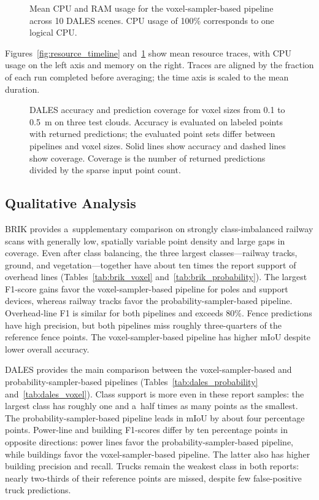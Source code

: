 \begin{figure}[H]
  \centering
  \caption{Mean CPU and RAM usage for the voxel-sampler-based pipeline across 10 DALES scenes. CPU usage of 100\% corresponds to one logical CPU.}
  \label{fig:resource_timeline_voxel}
\end{figure}

Figures~\ref{fig:resource_timeline} and~\ref{fig:resource_timeline_voxel} show mean resource traces, with CPU usage on the left axis and memory on the right. Traces are aligned by the fraction of each run completed before averaging; the time axis is scaled to the mean duration.

\begin{figure}[H]
  \centering
  \voxelsizeplot
  \caption{DALES accuracy and prediction coverage for voxel sizes from 0.1 to 0.5~m on three test clouds. Accuracy is evaluated on labeled points with returned predictions; the evaluated point sets differ between pipelines and voxel sizes. Solid lines show accuracy and dashed lines show coverage. Coverage is the number of returned predictions divided by the sparse input point count.}
  \label{fig:dales_voxel_size}
\end{figure}

\subsection{Qualitative Analysis}

BRIK provides a~supplementary comparison on strongly class-imbalanced railway scans with generally low, spatially variable point density and large gaps in coverage. Even after class balancing, the three largest classes---railway tracks, ground, and vegetation---together have about ten times the report support of overhead lines (Tables~\ref{tab:brik_voxel} and~\ref{tab:brik_probability}). The largest F1-score gains favor the voxel-sampler-based pipeline for poles and support devices, whereas railway tracks favor the probability-sampler-based pipeline. Overhead-line F1 is similar for both pipelines and exceeds 80\%. Fence predictions have high precision, but both pipelines miss roughly three-quarters of the reference fence points. The voxel-sampler-based pipeline has higher mIoU despite lower overall accuracy.

DALES provides the main comparison between the voxel-sampler-based and probability-sampler-based pipelines (Tables~\ref{tab:dales_probability} and~\ref{tab:dales_voxel}). Class support is more even in these report samples: the largest class has roughly one and a~half times as many points as the smallest. The probability-sampler-based pipeline leads in mIoU by about four percentage points. Power-line and building F1-scores differ by ten percentage points in opposite directions: power lines favor the probability-sampler-based pipeline, while buildings favor the voxel-sampler-based pipeline. The latter also has higher building precision and recall. Trucks remain the weakest class in both reports: nearly two-thirds of their reference points are missed, despite few false-positive truck predictions.

